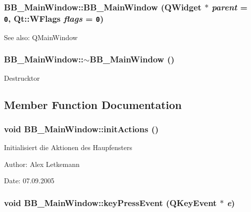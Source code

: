 \subsubsection{\setlength{\rightskip}{0pt plus 5cm}BB\_\-Main\-Window::BB\_\-Main\-Window (QWidget $\ast$ {\em parent} = {\tt 0}, Qt::WFlags {\em flags} = {\tt 0})}\label{classBB__MainWindow_a0}


\begin{Desc}
\item[See also:]QMain\-Window\end{Desc}
\subsubsection{\setlength{\rightskip}{0pt plus 5cm}BB\_\-Main\-Window::$\sim$BB\_\-Main\-Window ()}\label{classBB__MainWindow_a1}


Destrucktor

\subsection{Member Function Documentation}
\subsubsection{\setlength{\rightskip}{0pt plus 5cm}void BB\_\-Main\-Window::init\-Actions ()}\label{classBB__MainWindow_a2}


Initialisiert die Aktionen des Haupfensters \begin{Desc}
\item[Author:]Alex Letkemann \end{Desc}
\begin{Desc}
\item[Date:]07.09.2005\end{Desc}
\subsubsection{\setlength{\rightskip}{0pt plus 5cm}void BB\_\-Main\-Window::key\-Press\-Event (QKey\-Event $\ast$ {\em e})\hspace{0.3cm}{\tt  [protected, virtual]}}\label{classBB__MainWindow_b0}


